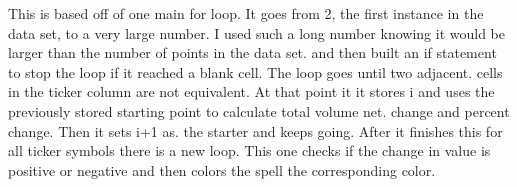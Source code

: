 This is based off of one main for loop.  It goes from 2,  the first instance in the data set, to a very large number.  I used such a long number knowing it would be larger than the number of points in the data set. and then built an if statement to stop the loop if it reached a blank cell.  The loop goes until two adjacent. cells in the ticker column are not equivalent.   At that point it it stores  i and uses the previously stored starting point to calculate total volume net. change and percent change.  Then it sets i+1 as. the starter and keeps going.  After it finishes this for all ticker symbols there is a new loop.  This one  checks if  the change in value is positive or negative and then colors the spell the corresponding color.